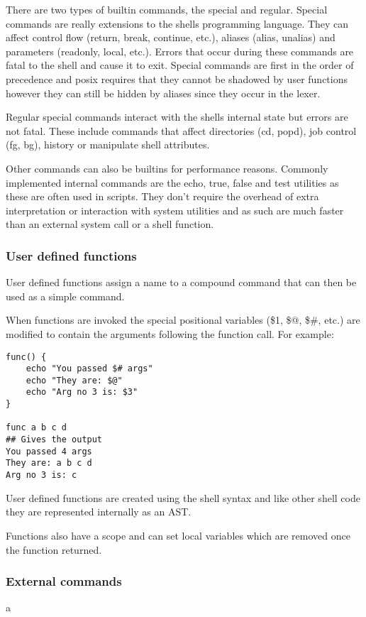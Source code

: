 There are two types of builtin commands, the special and regular.
Special commands are really extensions to the shells programming language.
They can affect control flow (return, break, continue, etc.), aliases (alias, unalias) and parameters (readonly, local, etc.).
Errors that occur during these commands are fatal to the shell and cause it to exit.
Special commands are first in the order of precedence and posix requires that they cannot be shadowed by user functions however they can still be hidden by aliases since they occur in the lexer.

Regular special commands interact with the shells internal state but errors are not fatal.
These include commands that affect directories (cd, popd), job control (fg, bg), history or manipulate shell attributes.

Other commands can also be builtins for performance reasons.
Commonly implemented internal commands are the echo, true, false and test utilities as these are often used in scripts.
They don't require the overhead of extra interpretation or interaction with system utilities and as such are much faster than an external system call or a shell function.

\subsubsection{User defined functions}
User defined functions assign a name to a compound command that can then be used as a simple command.

When functions are invoked the special positional variables (\$1, \$@, \$\#, etc.) are modified to contain the arguments following the function call. For example:
\begin{verbatim}
func() {
	echo "You passed $# args"
    echo "They are: $@"
    echo "Arg no 3 is: $3"
}

func a b c d
## Gives the output
You passed 4 args
They are: a b c d
Arg no 3 is: c
\end{verbatim}

User defined functions are created using the shell syntax and like other shell code they are represented internally as an AST.


Functions also have a scope and can set local variables which are removed once the function returned.

\subsubsection{External commands}
a

